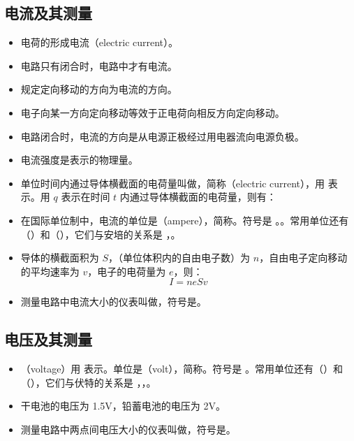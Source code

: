 \subsection{电流及其测量}
\begin{itemize}
\item 电荷的形成电流（electric current）。
\item 电路只有闭合时，电路中才有电流。
\item 规定定向移动的方向为电流的方向。
\item 电子向某一方向定向移动等效于正电荷向相反方向定向移动。
\item 电路闭合时，电流的方向是从电源正极经过用电器流向电源负极。
\item 电流强度是表示的物理量。
\item 单位时间内通过导体横截面的电荷量叫做，简称（electric current），用  表示。用 $q$ 表示在时间 $t$ 内通过导体横截面的电荷量，则有：
\item 在国际单位制中，电流的单位是（ampere），简称。符号是 。。常用单位还有（）和（），它们与安培的关系是 ，。
\item 导体的横截面积为 $S$，（单位体积内的自由电子数）为 $n$，自由电子定向移动的平均速率为 $v$，电子的电荷量为 $e$，则：
$$
I=neSv
$$
\item 测量电路中电流大小的仪表叫做，符号是\ammeter。
\end{itemize}

\subsection{电压及其测量}
\begin{itemize}
\item {}（voltage）用  表示。单位是（volt），简称。符号是 。常用单位还有（）和（），它们与伏特的关系是 ，，。
\item 干电池的电压为 1.5V，铅蓄电池的电压为 2V。
\item 测量电路中两点间电压大小的仪表叫做，符号是\voltmeter。
\end{itemize}


